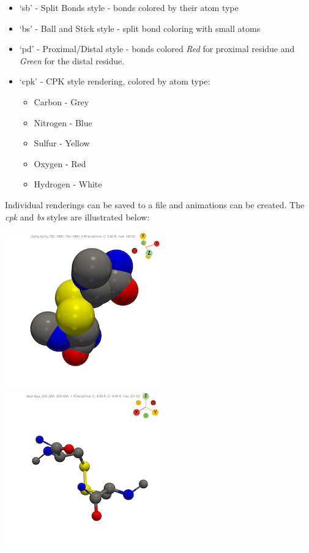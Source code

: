 \begin{itemize}
\item
  `sb' - Split Bonds style - bonds colored by their atom type
\item
  `bs' - Ball and Stick style - split bond coloring with small atoms
\item
  `pd' - Proximal/Distal style - bonds colored \emph{Red} for proximal
  residue and \emph{Green} for the distal residue.
\item
  `cpk' - CPK style rendering, colored by atom type:

  \begin{itemize}
  \tightlist
  \item
    Carbon - Grey
  \item
    Nitrogen - Blue
  \item
    Sulfur - Yellow
  \item
    Oxygen - Red
  \item
    Hydrogen - White
  \end{itemize}
\end{itemize}

Individual renderings can be saved to a file and animations can be
created. The \emph{cpk} and \emph{bs} styles are illustrated below:

\includegraphics{logo_cpk.png} \includegraphics{logo_bs.png}


